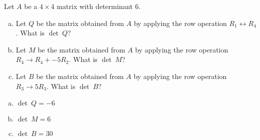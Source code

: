 
\begin{exerciseStatement}


Let \(A\) be a \(4 \times 4\) matrix with determinant \( 6 \).


\begin{enumerate}[(a)]
\item Let \(Q\) be the matrix obtained from \(A\) by applying the row operation \( R_1 \leftrightarrow R_4 \). What is \(\operatorname{det}\ Q\)?
\item Let \(M\) be the matrix obtained from \(A\) by applying the row operation \( R_4 \to R_4 + -5R_2 \). What is \(\operatorname{det}\ M\)?
\item Let \(B\) be the matrix obtained from \(A\) by applying the row operation \( R_3 \to 5R_3 \). What is \(\operatorname{det}\ B\)?
\end{enumerate}
    
\end{exerciseStatement}
    
\begin{exerciseAnswer} 

\begin{enumerate}[(a)]
\item \(\operatorname{det}\ Q= -6 \)
\item \(\operatorname{det}\ M= 6 \)
\item \(\operatorname{det}\ B= 30 \)
\end{enumerate}
    
\end{exerciseAnswer}
    
